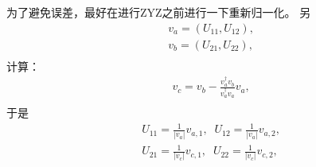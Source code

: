 为了避免误差，最好在进行ZYZ之前进行一下重新归一化。
另
\begin{equation}
\begin{split}
&v_a = (U_{11},U_{12}),\\
&v_b = (U_{21},U_{22}),\\
\end{split}
\end{equation}
计算：
\begin{equation}
\begin{split}
&v_c = v_b - \frac{v_a^{\dagger} v_b}{v_a^{\dagger} v_a}v_a,\\
\end{split}
\end{equation}
于是
\begin{equation}
\begin{split}
&U_{11}=\frac{1}{|v_a|}v_{a,1},\;\;U_{12}=\frac{1}{|v_a|}v_{a,2},\\
&U_{21}=\frac{1}{|v_c|}v_{c,1},\;\;U_{22}=\frac{1}{|v_c|}v_{c,2},\\
\end{split}
\end{equation}